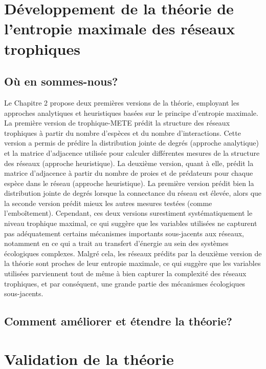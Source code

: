 \section{Développement de la théorie de l'entropie maximale des réseaux trophiques} 

\subsection{Où en sommes-nous?} 

Le Chapitre 2 propose deux premières versions de la théorie, employant les
approches analytiques et heuristiques basées sur le principe d'entropie
maximale. La première version de trophique-METE prédit la structure des réseaux
trophiques à partir du nombre d'espèces et du nombre d'interactions. Cette
version a permis de prédire la distribution jointe de degrés (approche
analytique) et la matrice d'adjacence utilisée pour calculer différentes mesures
de la structure des réseaux (approche heuristique). La deuxième version, quant à
elle, prédit la matrice d'adjacence à partir du nombre de proies et de
prédateurs pour chaque espèce dans le réseau (approche heuristique). La première
version prédit bien la distribution jointe de degrés lorsque la connectance du
réseau est élevée, alors que la seconde version prédit mieux les autres mesures
testées (comme l'emboîtement). Cependant, ces deux versions surestiment
systématiquement le niveau trophique maximal, ce qui suggère que les variables
utilisées ne capturent pas adéquatement certains mécanismes importants
sous-jacents aux réseaux, notamment en ce qui a trait au transfert d'énergie au
sein des systèmes écologiques complexes. Malgré cela, les réseaux prédits par la
deuxième version de la théorie sont proches de leur entropie maximale, ce qui
suggère que les variables utilisées parviennent tout de même à bien capturer la
complexité des réseaux trophiques, et par conséquent, une grande partie des
mécanismes écologiques sous-jacents.

\subsection{Comment améliorer et étendre la théorie?} 




\section{Validation de la théorie} 

